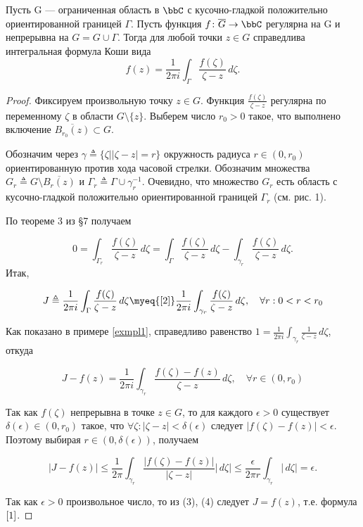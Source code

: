 \begin{thm} \label{T1}
 Пусть G — ограниченная область в $\bbC$ с кусочно-гладкой положительно ориентированной границей $\Gamma$. Пусть функция $f\colon \overline{G}\to \bbC$ регулярна на G и непрерывна на $G=G\cup\Gamma$. Тогда для любой точки $z\in G$ справедлива интегральная формула Коши вида
 \begin{equation} \label{1}
 f(z) = \frac{1}{2\pi i}\int_\Gamma \frac{f(\zeta)}{\zeta - z}\,d\zeta.
 \end{equation}
\end{thm}
\begin{proof}
Фиксируем произвольную точку $z \in G$. Функция $\frac{f(\zeta)}{\zeta - z}$ регулярна по переменному $\zeta$ в области $G \setminus \{z\}$. Выберем число $r_0 > 0$ такое, что выполнено включение $\overline{B_{r_0}(z)}\subset G$. 

Обозначим через $\gamma \triangleq \{ \zeta \bigl| |\zeta - z| = r \}$ окружность радиуса $r \in (0, r_0)$ ориентированную против хода часовой стрелки. Обозначим множества $G_r \triangleq G \setminus \overline{B_r(z)}$ и $\Gamma_r \triangleq \Gamma \cup \gamma_r^{-1}$. Очевидно, что множество $G_r$ есть область с кусочно-гладкой положительно ориентированной границей $\Gamma_r$ (см. рис. 1). 

По теореме 3 из §7 получаем

 \begin{equation} \label{2}
 0 = \int_{\Gamma_r} \frac{f(\zeta)}{\zeta - z}\,d\zeta = \int_\Gamma \frac{f(\zeta)}{\zeta - z}\,d\zeta - \int_{\gamma_r} \frac{f(\zeta)}{\zeta - z}\,d\zeta.
 \end{equation}
Итак,

\begin{equation} \label{3}
J \triangleq \frac{1}{2\pi i} \int_\Gamma \frac{f(\zeta)}{\zeta - z}\,d\zeta \myeq{\eqref{2}} \frac{1}{2\pi i} \int_{\gamma_r} \frac{f(\zeta)}{\zeta - z}\,d\zeta,  \quad  \forall r: 0 < r < r_0
\end{equation}

Как показано в примере \ref{exmpl1}, справедливо равенство $1 = \frac{1}{2\pi i} \int_{\gamma_r} \frac{1}{\zeta - z}\,d\zeta$, откуда 

$$J - f(z) = \frac{1}{2\pi i} \int_{\gamma_r} \frac{f(\zeta) - f(z)}{\zeta - z}\,d\zeta, \quad  \forall r \in (0,r_0)$$

Так как $f(\zeta)$ непрерывна в точке $z \in G$, то для каждого $\epsilon > 0$ существует $\delta(\epsilon) \in (0, r_0)$ такое, что $\forall \zeta : |\zeta - z| < \delta(\epsilon)$ следует $|f(\zeta) - f(z)| < \epsilon$. Поэтому выбирая $r \in (0, \delta(\epsilon))$, получаем

\begin{equation} \label{4}
|J - f(z)| \le \frac{1}{2\pi} \int_{\gamma_r} \frac{|f(\zeta) - f(z)|}{|\zeta - z|}|\,d\zeta| \le 
\frac{\epsilon}{2 \pi r} \int_{\gamma_r} |\,d\zeta| = \epsilon.
\end{equation}

Так как $\epsilon > 0$ произвольное число, то из (3), (4) следует $J = f(z)$, т.е. формула $\eqref{1}$.
\end{proof}

